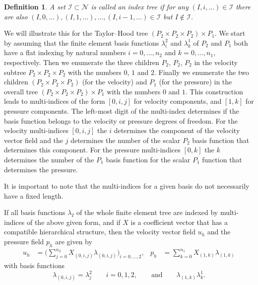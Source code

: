 \documentclass[a4paper,10pt,headings=normal,bibliography=totoc]{scrartcl}
\newtheorem{definition}{Definition}
\begin{document}
\begin{definition}
 A set $\mathcal{I} \subset \mathcal{N}$ is called an \emph{index tree}
 if for any $(I,i,\dots) \in \mathcal{I}$ there are also $(I,0,\dots),(I,1,\dots),\dots,(I,i-1,\dots) \in \mathcal{I}$
 but $I \notin \mathcal{I}$.
\end{definition}


We will illustrate this for the Taylor--Hood tree $(P_2 \times P_2 \times P_2) \times P_1$.
We start by assuming that the finite element basis functions $\lambda_i^2$ and $\lambda_k^1$
of $P_2$ and $P_1$ both
have a flat indexing by natural numbers $i=0,\dots,n_2$ and $k=0,\dots,n_1$,
respectively.
Then we enumerate the three children $P_2$, $P_2$, $P_2$
in the velocity subtree $P_2 \times P_2 \times P_2$
with the numbers $0$, $1$ and $2$.
Finally we enumerate the two children $(P_2 \times P_2 \times P_2)$ (for the velocity)
and $P_1$ (for the pressure) in the overall tree $(P_2 \times P_2 \times P_2) \times P_1$
with the numbers $0$ and $1$.
This construction leads to multi-indices of the form $[0,i,j]$ for velocity components, and $[1,k]$
for pressure components.
The left-most digit of the multi-index determines if the basis function
belongs to the velocity or pressure degrees of freedom.
For the velocity multi-indices $[0,i,j]$ the $i$ determines the component
of the velocity vector field and the $j$ determines the number of the scalar $P_2$ basis
function that determines this component.
For the pressure multi-indices $[0,k]$ the $k$ determines the number of the $P_1$ basis
function for the scalar $P_1$ function that determines the pressure.

It is important to note that the multi-indices for a given basis do not necessarily
have a fixed length.

If all basis functions $\lambda_I$ of the whole finite element tree are
indexed by multi-indices of the above given form,
and if $X$ is a coefficient vector that has a compatible hierarchical structure,
then the velocity vector field $u_h$ and the pressure field $p_h$ are given by
\begin{align*}
    u_h &= \bigg( \sum_{j=0}^{n_2} X_{(0,i,j)}\lambda_{(0,i,j)}\bigg)_{i=0,\dots,2},
    &
    p_h &= \sum_{k=0}^{n_1} X_{(1,k)}\lambda_{(1,k)}
\end{align*}
with basis functions
\begin{equation*}
    \lambda_{(0,i,j)} = \lambda^2_j \qquad i=0,1,2,
    \qquad \text{and} \qquad
    \lambda_{(1,k)} \lambda^1_k.
\end{equation*}
\end{document}
